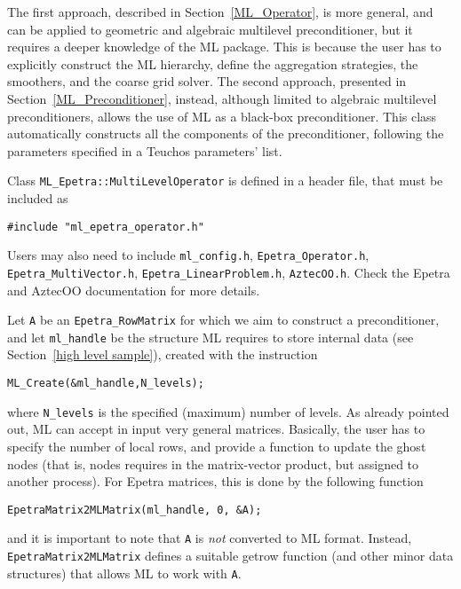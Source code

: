 The first approach, described in Section~\ref{ML_Operator}, is more
general, and can be applied to geometric and algebraic multilevel
preconditioner, but it requires a deeper knowledge of the ML package.
This is because the user has to explicitly construct the ML hierarchy,
define the aggregation strategies, the smoothers, and the coarse grid
solver. The second approach, presented in
Section~\ref{ML_Preconditioner}, instead, although limited to algebraic
multilevel preconditioners, allows the use of ML as a black-box
preconditioner. This class automatically constructs all the components
of the preconditioner, following the parameters specified in a Teuchos
parameters' list. 

\bigskip

Class \verb!ML_Epetra::MultiLevelOperator! is defined in a header file, that must
be included as
\begin{verbatim}
#include "ml_epetra_operator.h" 
\end{verbatim}
Users may also need to include \verb!ml_config.h!,
\verb!Epetra_Operator.h!, \verb!Epetra_MultiVector.h!,
\verb!Epetra_LinearProblem.h!,  \verb!AztecOO.h!. Check the Epetra and
AztecOO documentation for more details.

Let \verb!A! be an \verb!Epetra_RowMatrix! for which we aim to construct
a preconditioner, and let \verb!ml_handle! be the structure ML requires
to store internal data (see Section~\ref{high level sample}), created
with the instruction
\begin{verbatim}
ML_Create(&ml_handle,N_levels);
\end{verbatim}
where \verb!N_levels! is the specified (maximum) number of levels.  As
already pointed out, ML can accept in input very general matrices.
Basically, the user has to specify the number of local rows, and provide
a function to update the ghost nodes (that is, nodes requires in the
matrix-vector product, but assigned to another process). For Epetra
matrices, this is done by the following function
\begin{verbatim}
EpetraMatrix2MLMatrix(ml_handle, 0, &A);
\end{verbatim}
and it is important to note that \verb!A! is {\sl not} converted to ML
format. Instead, \verb!EpetraMatrix2MLMatrix! defines a suitable getrow
function (and other minor data structures) that allows ML to work with
\verb!A!.

